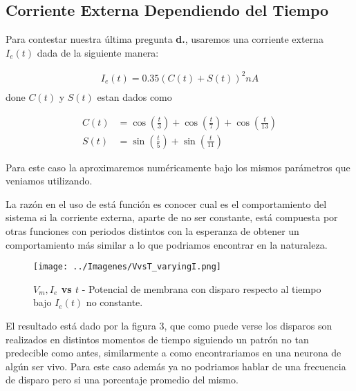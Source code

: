 \documentclass[10pt,journal,compsoc]{IEEEtran}
\begin{document}
\subsection{Corriente Externa Dependiendo del Tiempo}

Para contestar nuestra última pregunta \textbf{d.}, usaremos una corriente
externa $I_e(t)$ dada de la siguiente manera:

\begin{equation*}
  \begin{aligned}
    I_e(t) = 0.35\left(C(t) + S(t)\right)^{2}nA \\
  \end{aligned}
\end{equation*}
done $C(t)$ y $S(t)$ estan dados como

\begin{equation*}
  \begin{aligned}
    C(t) &= \cos\left(\frac{t}{3}\right) + \cos\left(\frac{t}{7}\right) + \cos\left(\frac{t}{13}\right) \\
    S(t) &= \sin\left(\frac{t}{5}\right) + \sin\left(\frac{t}{11}\right)
  \end{aligned}
\end{equation*}

Para este caso la aproximaremos numéricamente bajo los mismos parámetros que
veniamos utilizando.

La razón en el uso de está función es conocer cual es el comportamiento del
sistema si la corriente externa, aparte de no ser constante, está compuesta por
otras funciones con periodos distintos con la esperanza de obtener un
comportamiento más similar a lo que podriamos encontrar en la naturaleza.

\begin{figure}[!t]
  \centering
  \texttt{[image: ../Imagenes/VvsT\_varyingI.png]}
  \caption{\textbf{$V_m, I_e$ vs $t$} - Potencial de membrana con disparo
  respecto al tiempo bajo $I_e(t)$ no constante.}
  \label{fig_sim}
\end{figure}

El resultado está dado por la figura 3, que como puede verse los disparos son
realizados en distintos momentos de tiempo siguiendo un patrón no tan predecible
como antes, similarmente a como encontrariamos en una neurona de algún ser vivo.
Para este caso además ya no podriamos hablar de una frecuencia de disparo pero
si una porcentaje promedio del mismo.
\end{document}
